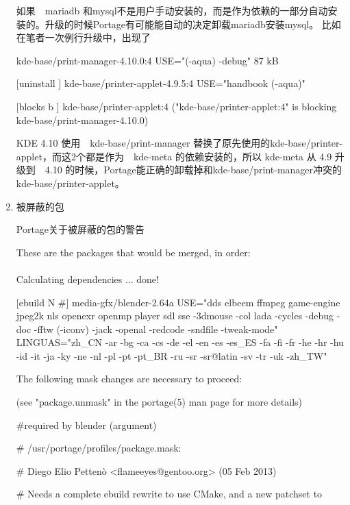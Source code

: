 \begin{enumerate}
如果　mariadb 和mysql不是用户手动安装的，而是作为依赖的一部分自动安装的。升级的时候Portage有可能能自动的决定卸载mariadb安装mysql。
比如在笔者一次例行升级中，出现了　

\begin{code}
\begin{flushleft}
[ebuild  N     ] kde-base/print-manager-4.10.0:4  USE="(-aqua) -debug" 87 kB

[uninstall     ] kde-base/printer-applet-4.9.5:4  USE="handbook (-aqua)"

[blocks b      ] kde-base/printer-applet:4 ("kde-base/printer-applet:4" is blocking kde-base/print-manager-4.10.0)

\end{flushleft}
\end{code}

KDE 4.10 使用　kde-base/print-manager 替换了原先使用的kde-base/printer-applet，而这2个都是作为　kde-meta 的依赖安装的，所以 kde-meta 从 4.9 升级到　4.10 的时候，Portage能正确的卸载掉和kde-base/print-manager冲突的kde-base/printer-applet。

\item 被屏蔽的包

\begin{example}{Portage关于被屏蔽的包的警告}

\begin{code}

These are the packages that would be merged, in order:\\
\\
Calculating dependencies               ... done!


[ebuild  N   \#] media-gfx/blender-2.64a  USE="dds elbeem ffmpeg game-engine jpeg2k nls openexr openmp player sdl sse -3dmouse -col
lada -cycles -debug -doc -fftw (-iconv) -jack -openal -redcode -sndfile -tweak-mode" LINGUAS="zh\_CN -ar -bg -ca -cs -de -el -en -es
 -es\_ES -fa -fi -fr -he -hr -hu -id -it -ja -ky -ne -nl -pl -pt -pt\_BR -ru -sr -sr@latin -sv -tr -uk -zh\_TW" 

The following mask changes are necessary to proceed:

\qquad (see "package.unmask" in the portage(5) man page for more details)

\#required by blender (argument)

\# /usr/portage/profiles/package.mask:

\# Diego Elio Pettenò <flameeyes@gentoo.org> (05 Feb 2013)

\# Needs a complete ebuild rewrite to use CMake, and a new patchset to


\end{code}
\end{example}
\end{enumerate}
